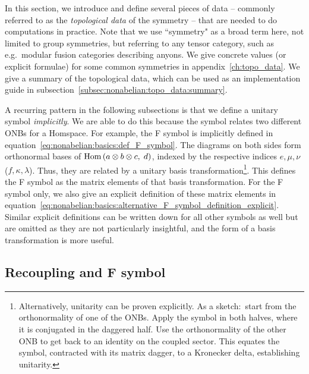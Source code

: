 In this section, we introduce and define several pieces of data -- commonly referred to as the \emph{topological data} of the symmetry -- that are needed to do computations in practice.
%
Note that we use ``symmetry" as a broad term here, not limited to group symmetries, but referring to any tensor category, such as e.g.~modular fusion categories describing anyons.
%
We give concrete values (or explicit formulae) for some common symmetries in appendix~\ref{ch:topo_data}.
%
We give a summary of the topological data, which can be used as an implementation guide in subsection~\ref{subsec:nonabelian:topo_data:summary}.

A recurring pattern in the following subsections is that we define a unitary symbol \emph{implicitly}.
%
We are able to do this because the symbol relates two different ONBs for a Homspace.
%
For example, the F symbol is implicitly defined in equation~\eqref{eq:nonabelian:basics:def_F_symbol}.
%
The diagrams on both sides form orthonormal bases of $\mathrm{Hom}\left(a \otimes b \otimes c,\; d\right)$, indexed by the respective indices ${e, \mu, \nu}$ (${f,\kappa,\lambda}$).
%
Thus, they are related by a unitary basis transformation\footnote{
    Alternatively, unitarity can be proven explicitly.
    As a sketch:~start from the orthonormality of one of the ONBs. Apply the symbol in both halves, where it is conjugated in the daggered half. Use the orthonormality of the other ONB to get back to an identity on the coupled sector. This equates the symbol, contracted with its matrix dagger, to a Kronecker delta, establishing unitarity.
}.
%
This defines the F symbol as the matrix elements of that basis transformation.
%
For the F symbol only, we also give an explicit definition of these matrix elements in equation~\eqref{eq:nonabelian:basics:alternative_F_symbol_definition_explicit}.
%
Similar explicit definitions can be written down for all other symbols as well but are omitted as they are not particularly insightful, and the form of a basis transformation is more useful.

\subsection{Recoupling and F symbol}
\label{subsec:nonabelian:topo_data:F_symbol}

